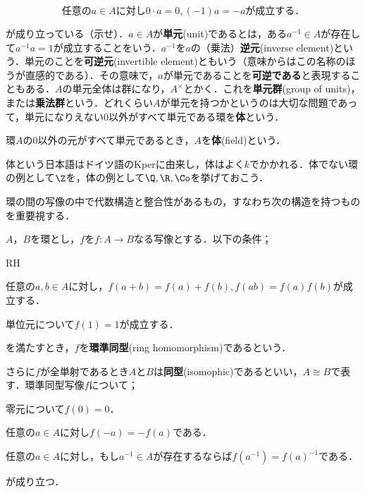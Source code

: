 \[\text{任意の} a\in A\text{に対し} 0\cdot a=0, (-1)a=-a\text{が成立する．}\]

が成り立っている（示せ）．$a\in A$が\textbf{単元}(unit)であるとは，ある$a^{-1}\in A$が存在して$a^{-1}a=1$が成立することをいう．$a^{-1}$を$a$の（乗法）\textbf{逆元}(inverse element)という．単元のことを\textbf{可逆元}(invertible element)ともいう（意味からはこの名称のほうが直感的である）．その意味で，$a$が単元であることを\textbf{可逆である}と表現することもある．$A$の単元全体は群になり，$A^\times$とかく．これを\textbf{単元群}(group of units)，または\textbf{乗法群}という．どれくらい$A$が単元を持つかというのは大切な問題であって，単元になりえない$0$以外がすべて単元である環を\textbf{体}という．

\begin{defi}[体]
	環$A$の0以外の元がすべて単元であるとき，$A$を\textbf{体}(field)という．
\end{defi}

体という日本語はドイツ語のKperに由来し，体はよく$k$でかかれる．体でない環の例として$\Z$を，体の例として$\Q, \R, \Co$を挙げておこう．

環の間の写像の中で代数構造と整合性があるもの，すなわち次の構造を持つものを重要視する．

\begin{defi}[環準同型]
	$A，B$を環とし，$f$を$f:A\to B$なる写像とする．以下の条件；
	\begin{defiterm}{RH}
		\item 任意の$a,b\in A$に対し，$f(a+b)=f(a)+f(b), f(ab)=f(a)f(b)$が成立する．
		\item 単位元について$f(1)=1$が成立する．
	\end{defiterm}
	
	を満たすとき，$f$を\textbf{環準同型}(ring homomorphism)であるという．
\end{defi}

さらに$f$が全単射であるとき$A$と$B$は\textbf{同型}(isomophic)であるといい，$A\cong B$で表す．環準同型写像$f$について；

\begin{sakura}
	\item 零元について$f(0)=0$．
	\item 任意の$a\in A$に対し$f(-a)=-f(a)$である．
	\item 任意の$a\in A$に対し，もし$a^{-1}\in A$が存在するならば$f(a^{-1})=f(a)^{-1}$である．
\end{sakura}
が成り立つ．

